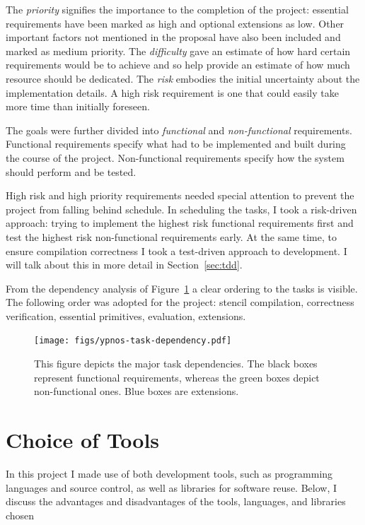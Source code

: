 \documentclass[
    12pt,
    a4paper,
    twoside,
    openright,
    ]{scrbook}
\begin{document}
The \emph{priority} signifies the importance to the completion of the project:
essential requirements have been marked as high and optional extensions as
low. Other important factors not mentioned in the proposal have also been
included and marked as medium priority. The \emph{difficulty} gave an estimate
of how hard certain requirements would be to achieve and so help provide an
estimate of how much resource should be dedicated. The \emph{risk} embodies the
initial uncertainty about the implementation details. A high risk requirement is
one that could easily take more time than initially foreseen.

The goals were further divided into \emph{functional} and \emph{non-functional}
requirements. Functional requirements specify what had to be implemented and
built during the course of the project. Non-functional requirements specify how
the system should perform and be tested.

High risk and high priority requirements needed special attention to prevent the
project from falling behind schedule. In scheduling the tasks, I took a
risk-driven approach: trying to implement the highest risk functional
requirements first and test the highest risk non-functional requirements
early. At the same time, to ensure compilation correctness I took a test-driven
approach to development. I will talk about this in more detail in
Section~\ref{sec:tdd}.

From the dependency analysis of Figure~\ref{fig:task-dep} a clear ordering to
the tasks is visible. The following order was adopted for the project: stencil
compilation, correctness verification, essential primitives, evaluation,
extensions.

\begin{figure}[h]
  \centering
  \texttt{[image: figs/ypnos-task-dependency.pdf]}
  \caption{This figure depicts the major task dependencies. The black boxes
    represent functional requirements, whereas the green boxes depict
    non-functional ones. Blue boxes are extensions.}
  \label{fig:task-dep}
\end{figure}

\section{Choice of Tools}

In this project I made use of both development tools, such as programming
languages and source control, as well as libraries for software reuse. Below, I
discuss the advantages and disadvantages of the tools, languages, and libraries
chosen
\end{document}

